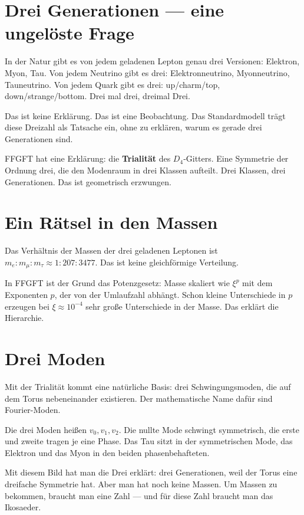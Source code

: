 \documentclass[12pt,oneside]{book}
\begin{document}
\section{Drei Generationen — eine ungelöste Frage}

In der Natur gibt es von jedem geladenen Lepton genau drei Versionen: Elektron, Myon, Tau. Von jedem Neutrino gibt es drei: Elektronneutrino, Myonneutrino, Tauneutrino. Von jedem Quark gibt es drei: up/charm/top, down/strange/bottom. Drei mal drei, dreimal Drei.

Das ist keine Erklärung. Das ist eine Beobachtung. Das Standardmodell trägt diese Dreizahl als Tatsache ein, ohne zu erklären, warum es gerade drei Generationen sind.

FFGFT hat eine Erklärung: die \textbf{Trialität} des $D_4$-Gitters. Eine Symmetrie der Ordnung drei, die den Modenraum in drei Klassen aufteilt. Drei Klassen, drei Generationen. Das ist geometrisch erzwungen.

\section{Ein Rätsel in den Massen}

Das Verhältnis der Massen der drei geladenen Leptonen ist $m_e : m_\mu : m_\tau \approx 1 : 207 : 3477$. Das ist keine gleichförmige Verteilung.

In FFGFT ist der Grund das Potenzgesetz: Masse skaliert wie $\xi^p$ mit dem Exponenten $p$, der von der Umlaufzahl abhängt. Schon kleine Unterschiede in $p$ erzeugen bei $\xi \approx 10^{-4}$ sehr große Unterschiede in der Masse. Das erklärt die Hierarchie.

\section{Drei Moden}

Mit der Trialität kommt eine natürliche Basis: drei Schwingungsmoden, die auf dem Torus nebeneinander existieren. Der mathematische Name dafür sind Fourier-Moden.

Die drei Moden heißen $v_0, v_1, v_2$. Die nullte Mode schwingt symmetrisch, die erste und zweite tragen je eine Phase. Das Tau sitzt in der symmetrischen Mode, das Elektron und das Myon in den beiden phasenbehafteten.

Mit diesem Bild hat man die Drei erklärt: drei Generationen, weil der Torus eine dreifache Symmetrie hat. Aber man hat noch keine Massen. Um Massen zu bekommen, braucht man eine Zahl — und für diese Zahl braucht man das Ikosaeder.
\end{document}
